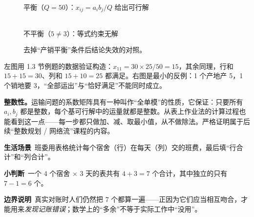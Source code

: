 \begin{figure}[H]
\centering
\begin{minipage}{0.47\linewidth}\centering
{}\\[-2pt]
{\small 平衡（$Q=50$）：$x_{ij}=a_ib_j/Q$ 给出可行解}
\end{minipage}\hfill
\begin{minipage}{0.47\linewidth}\centering
{}\\[-2pt]
{\small 不平衡（$5\ne3$）：等式约束无解}
\end{minipage}
\caption{去掉“产销平衡”条件后结论失效的对照。}\label{fig:balance}
\end{figure}
左图用 1.3 节例题的数据验证构造：$x_{11}=30\times25/50=15$，其余同理，行和 $15+15=30$、列和 $15+10=25$ 都满足。右图是最小的反例：1 个产地产 5，1 个销地要 3，“全部运出”与“恰好满足”不能同时成立。

\begin{extbox}
\textbf{整数性。}运输问题的系数矩阵具有一种叫作“全单模”的性质，它保证：只要所有 $a_i,b_j$ 都是整数，每个基可行解中的运量就都是整数。从表上作业法的计算过程也能看到这一点——每一步都只做加、减、取最小值，从不做除法。严格证明属于后续“整数规划 / 网络流”课程的内容。
\end{extbox}

\begin{lifebox}[表格的“合计”栏]
\textbf{生活场景}\ 班委用表格统计每个宿舍（行）在每天（列）交的班费，最后填“行合计”和“列合计”。\par
{}
\textbf{小判断}\ 一个 4 个宿舍 × 3 天的表共有 $4+3=7$ 个合计，其中独立的只有 $7-1=6$ 个。\par
\textbf{边界说明}\ 真实对账时人们仍然把 7 个都算一遍——正因为它们应当相互吻合，才能用来\emph{发现记账错误}；数学上的“多余”不等于实际工作中“没用”。
\end{lifebox}

